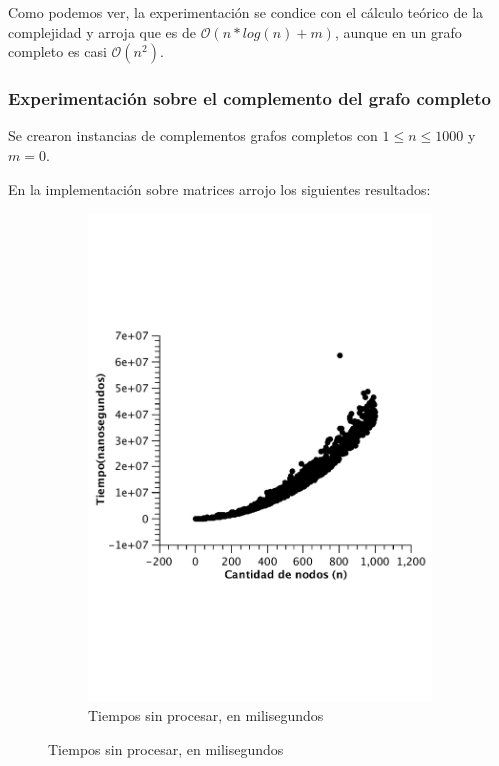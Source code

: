Como podemos ver, la experimentación se condice con el cálculo teórico de la complejidad y arroja que es de $\mathcal{O}(n*log(n) + m)$, aunque en un grafo completo es casi $\mathcal{O}(n^2)$.



\subsubsection{Experimentación sobre el complemento del grafo completo}

Se crearon instancias de complementos grafos completos con $1 \leq n \leq 1000$ y $m = 0$.

En la implementación sobre matrices arrojo los siguientes resultados:\\

\begin{figure}[H]
        \centering
\begin{subfigure}[b]{0.5\textwidth}
                \includegraphics[width=\textwidth]{imagenes/vacio-matriz-1.pdf}
                \caption{Tiempos sin procesar, en milisegundos}
        \end{subfigure}%


\end{figure}
